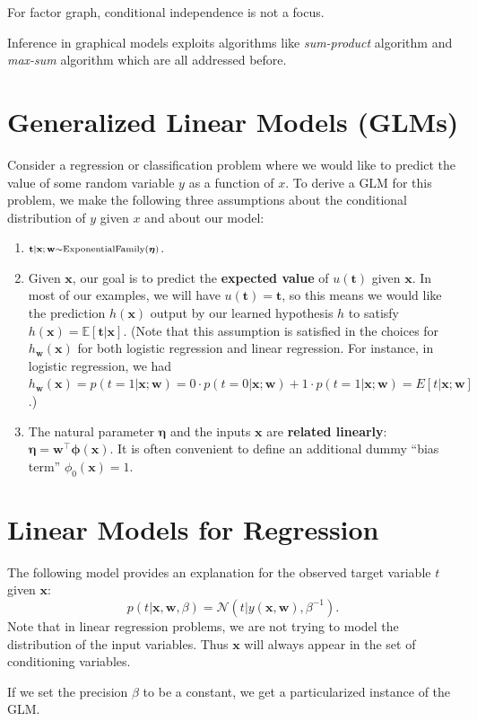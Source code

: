 \documentclass[a4paper]{report}
\newcommand{\up}{\mathrm}
\newcommand{\wave}{\scriptsize{\sim}}
\renewcommand{\bf}{\mathbf}
\renewcommand{\cal}{\mathcal}
\newcommand{\bb}{\mathbb}
\newcommand{\imp}[1]{{\color{blue}\textit{#1}}}
\newcommand{\bs}{\boldsymbol}
\begin{document}
For factor graph, conditional independence is not a focus.

Inference in graphical models exploits algorithms like \imp{sum-product} algorithm and \imp{max-sum} algorithm which are all addressed before.
\section{Generalized Linear Models (GLMs)}
Consider a regression or classification problem where we would like to predict the value of some random variable $y$ as a function of $x$. To derive a GLM for this problem, we make the following three assumptions about the conditional distribution of $y$ given $x$ and about our model:
\begin{enumerate}
	\item $\bf{t}|\bf{x};\bf{w} \wave \up{ExponentialFamily}(\bs{\eta})$.		
	\item Given $\bf{x}$, our goal is to predict the \textbf{expected value} of $u(\bf{t})$ given $\bf{x}$.
	In most of our examples, we will have $u(\bf{t}) = \bf{t}$, so this means we
	would like the prediction $h(\bf{x})$ output by our learned hypothesis $h$ to satisfy $h(\bf{x})=\bb{E}[\bf{t|x}]$. (Note that this assumption is satisfied in the choices for $h_{\bf{w}}(\bf{x})$ for both logistic regression and linear regression. For
	instance, in logistic regression, we had $h_{\bf{w}}(\bf{x}) = p(t = 1|\bf{x};\bf{w})=0 \cdot p(t=0|\bf{x};\bf{w}) + 1\cdot p(t = 1|\bf{x};\bf{w})=E[t|\bf{x}; \bf{w}]$.)
	\item The natural parameter $\bs{\eta}$ and the inputs $\bf{x}$ are \textbf{related linearly}: $ \bs{\eta} = \bf{w}^{\intercal} \bs{\phi}(\bf{x})$. It is often convenient to define an additional dummy ``bias term'' $\phi_0(\bf{x})=1$.
\end{enumerate}
\section{Linear Models for Regression}\label{LMR}
The following model provides an explanation for the observed target variable $t$ given $\bf{x}$:
\begin{equation}
	p(t|\bf{x,w},\beta) = \cal{N}(t|y(\bf{x,w}),\beta^{-1}). \label{LinearR}
\end{equation}
Note that in linear regression problems, we are not trying to model the distribution of the input variables. Thus $\bf{x}$ will always appear in the set of conditioning variables.

If we set the precision $\beta$ to be a constant, we get a particularized instance of the GLM. 
\end{document}
